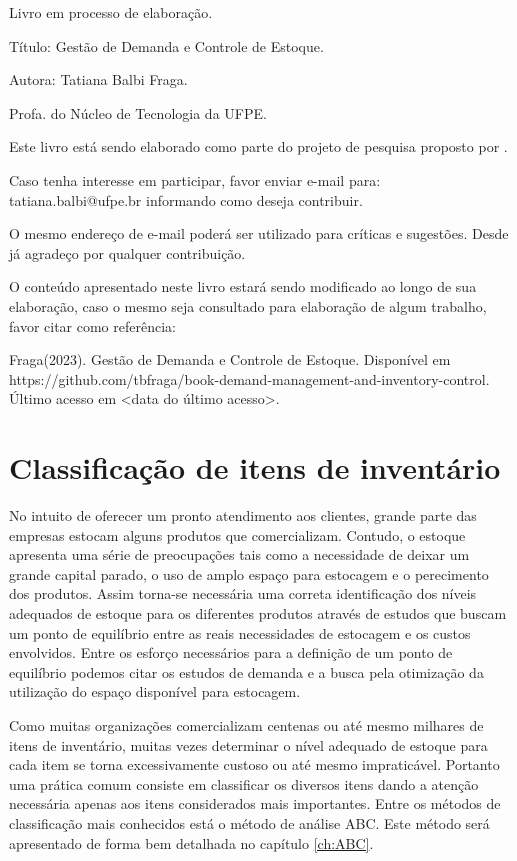 \documentclass{book}
\begin{document}
Livro em processo de elaboração.

Título: Gestão de Demanda e Controle de Estoque.

Autora: Tatiana Balbi Fraga. 

Profa. do Núcleo de Tecnologia da UFPE. 

Este livro está sendo elaborado como parte do projeto de pesquisa proposto por \cite{Fraga2019}.

Caso tenha interesse em participar, favor enviar e-mail para: tatiana.balbi@ufpe.br informando como deseja contribuir.

O mesmo endereço de e-mail poderá ser utilizado para críticas e sugestões. Desde já agradeço por qualquer contribuição. 

O conteúdo apresentado neste livro estará sendo modificado ao longo de sua elaboração, caso o mesmo seja consultado para elaboração de algum trabalho, favor citar como referência:

Fraga(2023). Gestão de Demanda e Controle de Estoque. Disponível em \\ 
https://github.com/tbfraga/book-demand-management-and-inventory-control. \\
Último acesso em <data do último acesso>.

\chapter{Classificação de itens de inventário}

No intuito de oferecer um pronto atendimento aos clientes, grande parte das empresas estocam alguns produtos que comercializam. Contudo, o estoque apresenta uma série de preocupações tais como a necessidade de deixar um grande capital parado, o uso de amplo espaço para estocagem e o perecimento dos produtos. Assim torna-se necessária uma correta identificação dos níveis adequados de estoque para os diferentes produtos através de estudos que buscam um ponto de equilíbrio entre as reais necessidades de estocagem e os custos envolvidos. Entre os esforço necessários para a definição de um ponto de equilíbrio podemos citar os estudos de demanda e a busca pela otimização da utilização do espaço disponível para estocagem.

Como muitas organizações comercializam centenas ou até mesmo milhares de itens de inventário, muitas vezes determinar o nível adequado de estoque para cada item se torna excessivamente custoso ou até mesmo impraticável. Portanto uma prática comum consiste em classificar os diversos itens dando a atenção necessária apenas aos itens considerados mais importantes. Entre os métodos de classificação mais conhecidos está o método de análise ABC. Este método será apresentado de forma bem detalhada no capítulo \ref{ch:ABC}.
\end{document}
